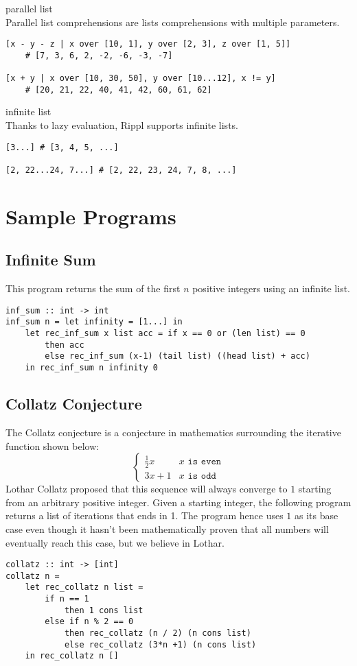 ﻿\documentclass[5pt]{article}
\begin{document}
parallel list \\
Parallel list comprehensions are lists comprehensions with multiple parameters.

\begin{lstlisting}[language=rippl]
[x - y - z | x over [10, 1], y over [2, 3], z over [1, 5]] 
    # [7, 3, 6, 2, -2, -6, -3, -7]
    
[x + y | x over [10, 30, 50], y over [10...12], x != y]
    # [20, 21, 22, 40, 41, 42, 60, 61, 62]
\end{lstlisting}

infinite list \\
Thanks to lazy evaluation, Rippl supports infinite lists. 

\begin{lstlisting}[language=rippl]
[3...] # [3, 4, 5, ...] 

[2, 22...24, 7...] # [2, 22, 23, 24, 7, 8, ...]
\end{lstlisting}

\section{Sample Programs}
\subsection{Infinite Sum}
This program returns the sum of the first $n$ positive integers using an 
infinite list.
\begin{lstlisting}[language=rippl]
inf_sum :: int -> int
inf_sum n = let infinity = [1...] in
    let rec_inf_sum x list acc = if x == 0 or (len list) == 0
        then acc
        else rec_inf_sum (x-1) (tail list) ((head list) + acc)
    in rec_inf_sum n infinity 0
\end{lstlisting}
\subsection{Collatz Conjecture}
The Collatz conjecture is a conjecture in mathematics surrounding the iterative 
function shown below:
$$ \begin{cases} 
      \frac{1}{2}x & x \texttt{ is even} \\
      3x + 1 & x \texttt{ is odd} 
   \end{cases}
$$
Lothar Collatz proposed that this sequence will always converge to $1$ starting 
from an arbitrary positive integer. Given a starting integer, the following 
program returns a list of iterations that ends in 1. The program hence uses $1$ 
as its base case even though it hasn't been mathematically proven that all 
numbers will eventually reach this case, but we believe in Lothar.
\begin{lstlisting}[language=rippl]
collatz :: int -> [int]
collatz n =
    let rec_collatz n list =
        if n == 1
            then 1 cons list
        else if n % 2 == 0
            then rec_collatz (n / 2) (n cons list)
            else rec_collatz (3*n +1) (n cons list)
    in rec_collatz n []
\end{lstlisting}
\end{document}
